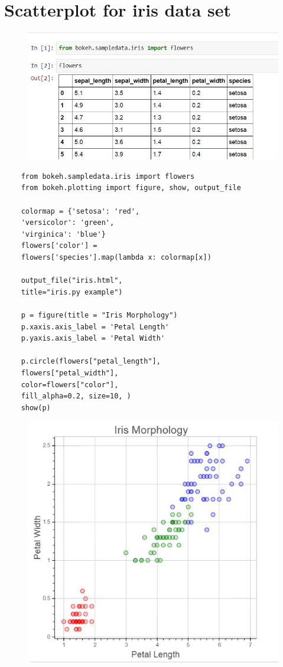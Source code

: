 \documentclass[a4paper,12pt]{article}
\begin{document}
\section*{Scatterplot for iris data set}
\begin{figure}[h!]
	\centering
	\includegraphics[width=0.8\linewidth]{images/iris-head}
\end{figure}
\begin{framed}
	\begin{verbatim}
	from bokeh.sampledata.iris import flowers
	from bokeh.plotting import figure, show, output_file
	
	colormap = {'setosa': 'red', 
	'versicolor': 'green', 
	'virginica': 'blue'}
	flowers['color'] = 
	flowers['species'].map(lambda x: colormap[x])
	
	output_file("iris.html", 
	title="iris.py example")
	
	p = figure(title = "Iris Morphology")
	p.xaxis.axis_label = 'Petal Length'
	p.yaxis.axis_label = 'Petal Width'
	
	p.circle(flowers["petal_length"],
	flowers["petal_width"],
	color=flowers["color"], 
	fill_alpha=0.2, size=10, )
	show(p)
	\end{verbatim}
\end{framed}
\newpage
\begin{figure}[h!]
	\centering
	\includegraphics[width=0.6\linewidth]{images/02-iris-scatterplot1-petal}
	
\end{figure}
\end{document}
